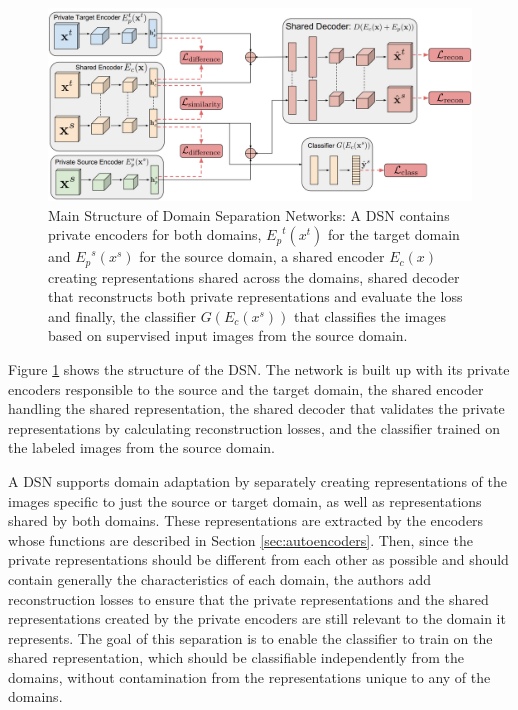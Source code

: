 \begin{figure}[tbh]
  \centering
    \includegraphics[width=\textwidth]{abbildungen/DSN.png}
  \caption{Main Structure of Domain Separation Networks: A DSN contains private encoders for both domains, ${E_p}^t(x^t)$ for the target domain and ${E_p}^s(x^s)$ for the source domain, a shared encoder $E_c(x)$ creating representations shared across the domains, shared decoder that reconstructs both private representations and evaluate the loss and finally, the classifier $G\left(E_c(x^s)\right)$ that classifies the images based on supervised input images from the source domain.}
  \label{fig:DSN}
\end{figure}

Figure \ref{fig:DSN} shows the structure of the DSN. The network is built up with its private encoders responsible to the source and the target domain, the shared encoder handling the shared representation, the shared decoder that validates the private representations by calculating reconstruction losses, and the classifier trained on the labeled images from the source domain. 

A DSN supports domain adaptation by separately creating representations of the images specific to just the source or target domain, as well as representations shared by both domains. These representations are extracted by the encoders whose functions are described in Section \ref{sec:autoencoders}. Then, since the private representations should be different from each other as possible and should contain generally the characteristics of each domain, the authors add reconstruction losses to ensure that the private representations and the shared representations created by the private encoders are still relevant to the domain it represents. The goal of this separation is to enable the classifier to train on the shared representation, which should be classifiable independently from the domains, without contamination from the representations unique to any of the domains. 

